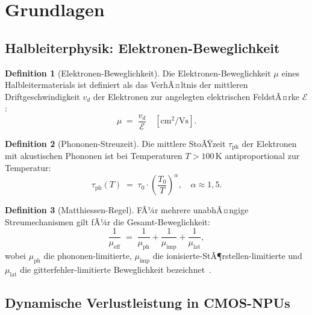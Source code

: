 ﻿\documentclass[a4paper,12pt]{article}
\theoremstyle{definition}
\newtheorem{definition}{Definition}
\begin{document}
\section{Grundlagen}

\subsection{Halbleiterphysik: Elektronen-Beweglichkeit}

\begin{definition}[Elektronen-Beweglichkeit]
Die Elektronen-Beweglichkeit $\mu$ eines Halbleitermaterials ist definiert als das VerhÃ¤ltnis
der mittleren Driftgeschwindigkeit $v_d$ der Elektronen zur angelegten elektrischen FeldstÃ¤rke
$\mathcal{E}$:
\[
\mu \;=\; \frac{v_d}{\mathcal{E}} \quad [\text{cm}^2/\text{Vs}].
\]
\end{definition}

\begin{definition}[Phononen-Streuzeit]
Die mittlere StoÃŸzeit $\tau_{\mathrm{ph}}$ der Elektronen mit akustischen Phononen ist
bei Temperaturen $T > 100\,\text{K}$ antiproportional zur Temperatur:
\[
\tau_{\mathrm{ph}}(T) \;=\; \tau_0 \cdot \left(\frac{T_0}{T}\right)^{\alpha}, \quad \alpha \approx 1{,}5.
\]
\end{definition}

\begin{definition}[Matthiessen-Regel]
FÃ¼r mehrere unabhÃ¤ngige Streumechanismen gilt fÃ¼r die Gesamt-Beweglichkeit:
\[
\frac{1}{\mu_{\mathrm{eff}}} \;=\; \frac{1}{\mu_{\mathrm{ph}}} + \frac{1}{\mu_{\mathrm{imp}}} + \frac{1}{\mu_{\mathrm{lat}}},
\]
wobei $\mu_{\mathrm{ph}}$ die phononen-limitierte, $\mu_{\mathrm{imp}}$ die
ionisierte-StÃ¶rstellen-limitierte und $\mu_{\mathrm{lat}}$ die gitterfehler-limitierte
Beweglichkeit bezeichnet~\cite{Sze2007}.
\end{definition}

\subsection{Dynamische Verlustleistung in CMOS-NPUs}
\end{document}
